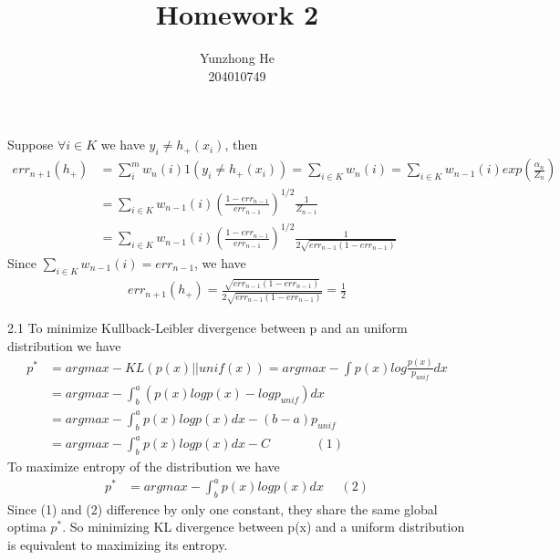 \documentclass[12pt]{article}
\newenvironment{problem}[2][Problem]{\begin{trivlist}
\item[\hskip \labelsep {\bfseries #1}\hskip \labelsep {\bfseries #2}]}{\end{trivlist}}
\begin{document}
 
 
\title{Homework 2}%
\author{Yunzhong He\\ %
204010749} %
 
\maketitle
 
\begin{problem}{Problem 1}
\item{}
Suppose $\forall i \in K$ we have $y_i \neq h_+(x_i)$, then
\begin{align*}
	err_{n+1}(h_+) &= \sum_{i}^m w_n(i)1(y_i \neq h_+(x_i)) = \sum_{i \in K} w_n(i) 
     = \sum_{i \in K} w_{n-1}(i) exp(\frac{\alpha_n}{Z_n}) \\
    &= \sum_{i \in K} w_{n-1}(i) (\frac{1-err_{n-1}}{err_{n-1}})^{1/2} \frac{1}{Z_{n-1}} \\
    &= \sum_{i \in K} w_{n-1}(i) (\frac{1-err_{n-1}}{err_{n-1}})^{1/2} \frac{1}{2\sqrt{err_{n-1}(1-err_{n-1})}} 
\end{align*}
Since $\sum_{i \in K}w_{n-1}(i) = err_{n-1}$, we have
\begin{align*}
	err_{n+1}(h_+) = \frac{\sqrt{err_{n-1}(1-err_{n-1})}}{2\sqrt{err_{n-1}(1-err_{n-1})}} = \frac{1}{2}
\end{align*}
\end{problem}

\begin{problem}{Problem 2}
\item{2.1}
To minimize Kullback-Leibler divergence between p and an uniform distribution we have 
\begin{align*}
	p^* &= argmax-KL(p(x)||unif(x)) = argmax-\int p(x) log \frac{p(x)}{p_{unif}} dx \\
	&= argmax-\int_b^a(p(x) logp(x) - logp_{unif}) dx \\
	&= argmax-\int_b^ap(x) logp(x) dx - (b-a)p_{unif} \\
	&= argmax-\int_b^ap(x) logp(x) dx - C  \ \ \ \ \ \ \ \ \ \ \ \ \ \ \ \  (1)
\end{align*}
To maximize entropy of the distribution we have
\begin{align*}
	p^* &= argmax-\int_b^ap(x) logp(x) dx \ \ \ \ \ \ (2)
\end{align*}
Since (1) and (2) difference by only one constant, they share the same global optima $p^*$. So minimizing KL divergence between p(x) and a uniform distribution is equivalent to maximizing its entropy.
\end{problem}
\end{document}
